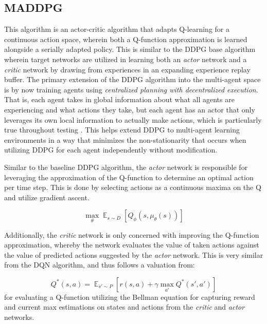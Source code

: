 \documentclass[11pt]{article}
\begin{document}
	\subsection{MADDPG}
	
	This algorithm is an actor-critic algorithm that adapts Q-learning for a continuous action space, wherein both a Q-function approximation is learned alongside a serially adapted policy. This is similar to the DDPG base algorithm wherein target networks are utilized in learning both an \textit{actor} network and a \textit{critic} network by drawing from experiences in an expanding experience replay buffer. The primary extension of the DDPG algorithm into the multi-agent space is by now training agents using \textit{centralized planning with decentralized execution}. That is, each agent takes in global information about what all agents are experiencing and what actions they take, but each agent has an actor that only leverages its own local information to actually make actions, which is particularly true throughout testing \cite{maddpg}. This helps extend DDPG to multi-agent learning environments in a way that minimizes the non-stationarity that occurs when utilizing DDPG for each agent independently without modification.
	
	Similar to the baseline DDPG algorithm, the \textit{actor} network is responsible for leveraging the approximation of the Q-function to determine an optimal action per time step. This is done by selecting actions as a continuous maxima on the Q and utilize gradient ascent.
	
	\begin{equation}
		\mathop{\mathbb{\text{max}}}_\theta\mathop{\mathbb{E}}_{s\sim D}\left[Q_{\phi}\left(s, \mu_{\theta}(s)\right)\right]
	\end{equation}
	
	Additionally, the \textit{critic} network is only concerned with improving the Q-function approximation, whereby the network evaluates the value of taken actions against the value of predicted actions suggested by the \textit{actor} network. This is very similar from the DQN algorithm, and thus follows a valuation from:
	
	\begin{equation}
		Q^*(s, a) = \mathop{\mathbb{E}}_{s' \sim P}\left[r(s, a) + \gamma\mathop{\mathbb{\text{max}}}_{a'}Q^*(s', a')\right]
	\end{equation}
	for evaluating a Q-function utilizing the Bellman equation for capturing reward and current max estimations on states and actions from the \textit{critic} and \textit{actor} networks.
	
\end{document}
